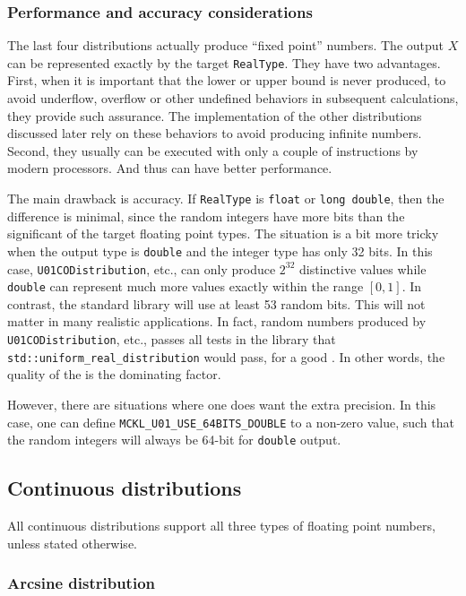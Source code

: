 \subsubsection{Performance and accuracy considerations}

The last four distributions actually produce ``fixed point'' numbers. The
output $X$ can be represented exactly by the target \verb|RealType|. They have
two advantages. First, when it is important that the lower or upper bound is
never produced, to avoid underflow, overflow or other undefined behaviors in
subsequent calculations, they provide such assurance. The implementation of the
other distributions discussed later rely on these behaviors to avoid producing
infinite numbers. Second, they usually can be executed with only a couple of
instructions by modern processors. And thus can have better performance.

The main drawback is accuracy. If \verb|RealType| is \verb|float| or
\verb|long double|, then the difference is minimal, since the random integers
have more bits than the significant of the target floating point types. The
situation is a bit more tricky when the output type is \verb|double| and the
integer type has only 32 bits. In this case, \verb|U01CODistribution|, etc.,
can only produce $2^{32}$ distinctive values while \verb|double| can represent
much more values exactly within the range $[0, 1]$. In contrast, the standard
library will use at least 53 random bits. This will not matter in many
realistic applications. In fact, random numbers produced by
\verb|U01CODistribution|, etc., passes all tests in the \testu library
\cite{Lecuyer:2007hv} that \verb|std::uniform_real_distribution| would pass,
for a good \rng. In other words, the quality of the \rng is the dominating
factor.

However, there are situations where one does want the extra precision. In this
case, one can define \verb|MCKL_U01_USE_64BITS_DOUBLE| to a non-zero value,
such that the random integers will always be 64-bit for \verb|double| output.

\subsection{Continuous distributions}
\label{sub:Continuous distributions}

All continuous distributions support all three types of floating point numbers,
unless stated otherwise.

\subsubsection{Arcsine distribution}

